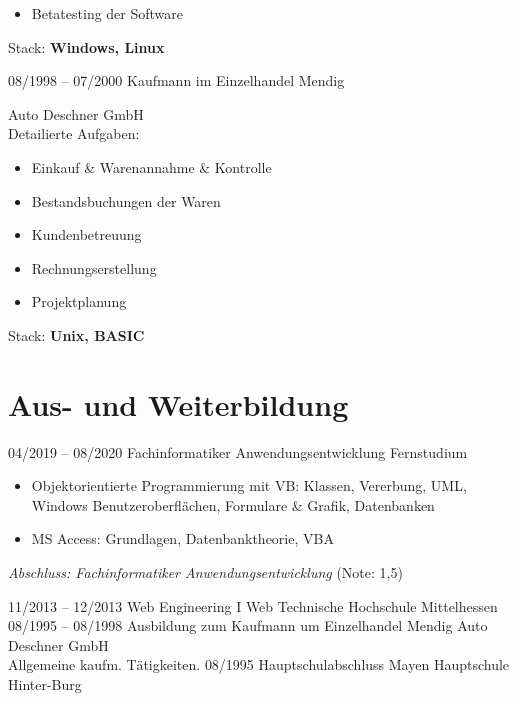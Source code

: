 \documentclass[a4paper]{friggeri-cv} %
\begin{document}
\begin{entrylist}
{\begin{itemize}
        \item Betatesting der Software        
    \end{itemize}
		Stack: \textbf{Windows, Linux}
}
\entry
{08/1998 -- 07/2000}
{Kaufmann im Einzelhandel}
{Mendig}
{Auto Deschner GmbH\\
    Detailierte Aufgaben:
    \begin{itemize}
        \item Einkauf \& Warenannahme \& Kontrolle
        \item Bestandsbuchungen der Waren
        \item Kundenbetreuung
        \item Rechnungserstellung
        \item Projektplanung
    \end{itemize}
		Stack: \textbf{Unix, BASIC}
}
\end{entrylist}


\section{Aus- und Weiterbildung}

\begin{entrylist}
\entry
{04/2019 -- 08/2020}
{Fachinformatiker Anwendungsentwicklung}
{Fernstudium}
{\begin{itemize}
        \item Objektorientierte Programmierung mit VB: Klassen, Vererbung, UML, Windows Benutzeroberflächen, Formulare \& Grafik, Datenbanken
        \item MS Access: Grundlagen, Datenbanktheorie, VBA
    \end{itemize}
{\emph{Abschluss: Fachinformatiker Anwendungsentwicklung} (Note: 1,5)}
}
\newline
\entry
{11/2013 -- 12/2013}
{Web Engineering I}
{Web}
{Technische Hochschule Mittelhessen}
\entry
{08/1995 -- 08/1998}
{Ausbildung zum Kaufmann um Einzelhandel}
{Mendig}
{Auto Deschner GmbH\\
Allgemeine kaufm. Tätigkeiten.
}
\entry
{08/1995}
{Hauptschulabschluss}
{Mayen}
{Hauptschule Hinter-Burg}
\end{entrylist}
\newpage
\end{document}
